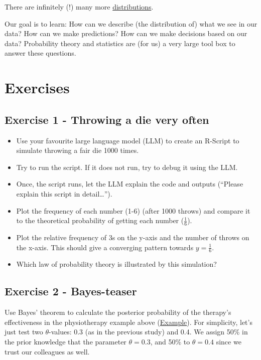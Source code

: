 \documentclass[
]{book}
\providecommand{\tightlist}{%
  \setlength{\itemsep}{0pt}\setlength{\parskip}{0pt}}
\begin{document}
There are infinitely (!) many more \href{https://en.wikipedia.org/wiki/List_of_probability_distributions}{distributions}.

Our goal is to learn: How can we describe (the distribution of) what we see in our data?
How can we make predictions? How can we make decisions based on our data?
Probability theory and statistics are (for us) a very large tool box to answer these questions.

\section{Exercises}\label{exercises}

\subsection{Exercise 1 - Throwing a die very often}\label{exercise1}

\begin{itemize}
\tightlist
\item
  Use your favourite large language model (LLM) to create an R-Script to simulate throwing a fair die 1000 times.
\item
  Try to run the script. If it does not run, try to debug it using the LLM.
\item
  Once, the script runs, let the LLM explain the code and outputs (``Please explain this script in detail\ldots{}'').
\item
  Plot the frequency of each number (1-6) (after 1000 throws) and compare it to the theoretical probability of getting each number (\(\frac{1}{6}\)).
\item
  Plot the relative frequency of 3s on the y-axis and the number of throws on the x-axis. This should give a converging pattern towards \(y=\frac{1}{6}\).
\item
  Which law of probability theory is illustrated by this simulation?
\end{itemize}

\subsection{Exercise 2 - Bayes-teaser}\label{exercise2}

Use Bayes' theorem to calculate the posterior probability of the therapy's effectiveness in the physiotherapy example above (\hyperref[example1_physio]{Example}).
For simplicity, let's just test two \(\theta\)-values: 0.3 (as in the previous study) and 0.4. We assign 50\% in the prior knowledge that the parameter
\(\theta=0.3\), and 50\% to \(\theta=0.4\) since we trust our colleagues as well.
\end{document}
